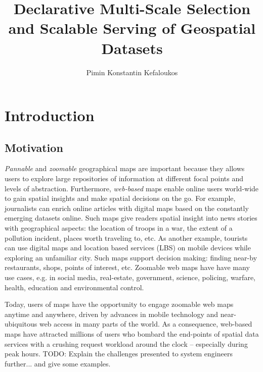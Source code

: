 \documentclass[11pt, oneside]{report}   	%
\title{Declarative Multi-Scale Selection and Scalable Serving of Geospatial Datasets}
\author{Pimin Konstantin Kefaloukos}
\begin{document}
\maketitle

\tableofcontents

\chapter{Introduction}


\section{Motivation}
\emph{Pannable} and \emph{zoomable} geographical maps are important because they allows users to explore large repositories of information at different focal points and levels of abstraction. Furthermore, \emph{web-based} maps enable online users world-wide to gain spatial insights and make spatial decisions on the go. For example, journalists can enrich online articles with digital maps based on the constantly emerging datasets online. Such maps give readers spatial insight into news stories with geographical aspects: the location of troops in a war, the extent of a pollution incident, places worth traveling to, etc. As another example, tourists can use digital maps and location based services (LBS) on mobile devices while exploring an unfamiliar city. Such maps support decision making: finding near-by restaurants, shops, points of interest, etc. Zoomable web maps have have many use cases, e.g. in social media, real-estate, government, science, policing, warfare, health, education and environmental control.%

Today, users of maps have the opportunity to engage zoomable web maps anytime and anywhere, driven by advances in mobile technology and near-ubiquitous web access in many parts of the world. As a consequence, web-based maps have attracted millions of users who bombard the end-points of spatial data services with a crushing request workload around the clock -- especially during peak hours. TODO: Explain the challenges presented to system engineers further... and give some examples.
\end{document}
